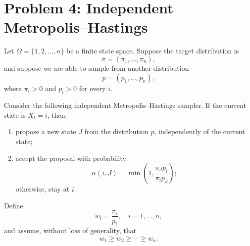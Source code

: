 \documentclass[answers,12pt,addpoints]{exam}
\begin{document}
\section*{Problem 4: Independent Metropolis--Hastings}

Let $\Omega = \{1, 2, \ldots, n\}$ be a finite state space. Suppose the target distribution is
\[
\pi = (\pi_1, \ldots, \pi_n),
\]
and suppose we are able to sample from another distribution
\[
p = (p_1, \ldots, p_n),
\]
where $\pi_i > 0$ and $p_i > 0$ for every $i$.

Consider the following independent Metropolis--Hastings sampler. If the current state is $X_t = i$, then:
\begin{enumerate}
\item propose a new state $J$ from the distribution $p$, independently of the current state;
\item accept the proposal with probability
\[
\alpha(i,J) = \min\left(1,\frac{\pi_J p_i}{\pi_i p_J}\right);
\]
otherwise, stay at $i$.
\end{enumerate}

Define
\[
w_i = \frac{\pi_i}{p_i}, \quad i = 1,\ldots,n,
\]
and assume, without loss of generality, that
\[
w_1 \ge w_2 \ge \cdots \ge w_n.
\]
\end{document}
